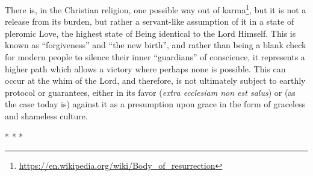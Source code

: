There is, in the Christian religion, one possible way out of karma\footnote{\url{https://en.wikipedia.org/wiki/Body\_of\_resurrection}}, but it is not a release from its burden, but rather a servant-like assumption of it in a state of pleromic Love, the highest state of Being identical to the Lord Himself. This is known as ``forgiveness'' and ``the new birth'', and rather than being a blank check for modern people to silence their inner ``guardians'' of conscience, it represents a higher path which allows a victory where perhaps none is possible. This can occur at the whim of the Lord, and therefore, is not ultimately subject to earthly protocol or guarantees, either in its favor (\emph{extra ecclesiam non est salus}) or (as the case today is) against it as a presumption upon grace in the form of graceless and shameless culture.



\begin{center}* * *\end{center}


